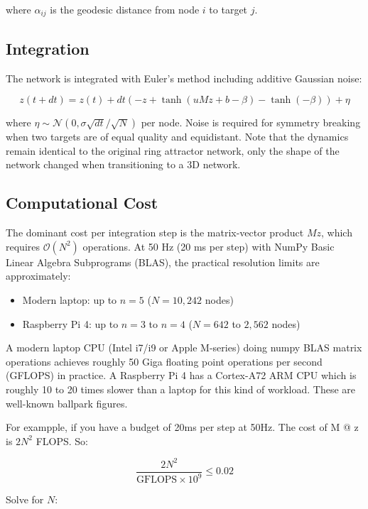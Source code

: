 \documentclass[12pt, letterpaper]{article}
\begin{document}
where $\alpha_{ij}$ is the geodesic distance from node $i$ to target $j$.  

\subsection{Integration}

The network is integrated with Euler's method including additive Gaussian noise:

\begin{equation}
    z(t + dt) = z(t) + dt \left(-z + \tanh(u M z + b - \beta) - \tanh(-\beta)\right) + \eta
\end{equation}

where $\eta \sim \mathcal{N}(0, \sigma\sqrt{dt}/\sqrt{N})$ per node. Noise is required for symmetry breaking when two targets are of equal quality and equidistant. Note that the dynamics remain identical to the original ring attractor network, only the shape of the network changed when transitioning to a 3D network.

\subsection{Computational Cost}

The dominant cost per integration step is the matrix-vector product $Mz$, which requires $\mathcal{O}(N^2)$ operations. At 50 Hz (20 ms per step) with NumPy Basic Linear Algebra Subprograms (BLAS), the practical resolution limits are approximately:

\begin{itemize}
    \item Modern laptop: up to $n = 5$ ($N = 10{,}242$ nodes)
    \item Raspberry Pi 4: up to $n = 3$ to $n = 4$ ($N = 642$ to $2{,}562$ nodes)
\end{itemize}

A modern laptop CPU (Intel i7/i9 or Apple M-series) doing numpy BLAS matrix operations achieves roughly 50 Giga floating point operations per second (GFLOPS) in practice. A Raspberry Pi 4 has a Cortex-A72 ARM CPU which is roughly 10 to 20 times slower than a laptop for this kind of workload. These are well-known ballpark figures.

For exampple, if you have a budget of 20ms per step at 50Hz. The cost of M @ z is $2N^2$ FLOPS. So:

$$\frac{2N^2}{\text{GFLOPS} \times 10^9} \leq 0.02$$

Solve for $N$:
\end{document}
